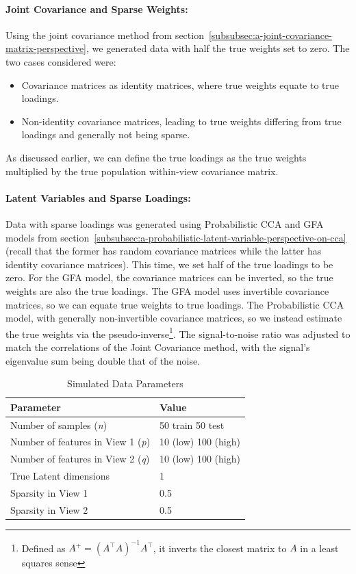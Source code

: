 \paragraph{Joint Covariance and Sparse Weights:} Using the joint covariance method from section~\ref{subsubsec:a-joint-covariance-matrix-perspective}, we generated data with half the true weights set to zero.
The two cases considered were:

\begin{itemize}
    \item Covariance matrices as identity matrices, where true weights equate to true loadings.
    \item Non-identity covariance matrices, leading to true weights differing from true loadings and generally not being sparse.
\end{itemize}

As discussed earlier, we can define the true loadings as the true weights multiplied by the true population within-view covariance matrix.

\paragraph{Latent Variables and Sparse Loadings:} Data with sparse loadings was generated using Probabilistic CCA and GFA models from section~\ref{subsubsec:a-probabilistic-latent-variable-perspective-on-cca}(recall that the former has random covariance matrices while the latter has identity covariance matrices).
This time, we set half of the true loadings to be zero.
For the GFA model, the covariance matrices can be inverted, so the true weights are also the true loadings.
The GFA model uses invertible covariance matrices, so we can equate true weights to true loadings.
The Probabilistic CCA model, with generally non-invertible covariance matrices, so we instead estimate the true weights via the pseudo-inverse\footnote{Defined as $A^+ = (A^\top A)^{-1} A^\top$, it inverts the closest matrix to $A$ in a least squares sense}.
The signal-to-noise ratio was adjusted to match the correlations of the Joint Covariance method, with the signal's eigenvalue sum being double that of the noise.

\begin{table}
\centering
\caption{Simulated Data Parameters}
\begin{tabular}{| l | l |}
\hline
\textbf{Parameter} & \textbf{Value} \\
\hline
Number of samples (\textit{n}) & 50 train 50 test \\
Number of features in View 1 (\textit{p}) & 10 (low) 100 (high) \\
Number of features in View 2 (\textit{q}) & 10 (low) 100 (high) \\
True Latent dimensions & 1 \\
Sparsity in View 1 & 0.5 \\
Sparsity in View 2 & 0.5 \\
\hline
\end{tabular}\label{table:simulated-data-parameters}
\end{table}

